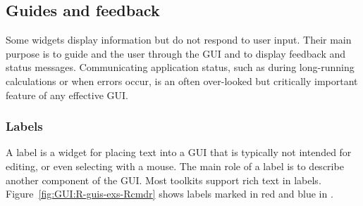 
\subsection{Guides and feedback}
\label{sec:GUI:info-display}

Some widgets display information but do not respond to user
input. Their main
purpose is to guide and the user through the GUI and to display
feedback and status messages. Communicating application status, such
as during long-running calculations or when errors occur, is an often
over-looked but critically important feature of any effective GUI. 

\subsubsection{Labels}
\label{sec:GUI:labels}
A label is a widget for placing text into a GUI that is typically not
intended for editing, or even selecting with a mouse. The main role of
a label is to describe another component of the GUI. Most toolkits
support rich text in labels. Figure~\ref{fig:GUI:R-guis-exs-Rcmdr}
shows labels marked in red and blue in .

